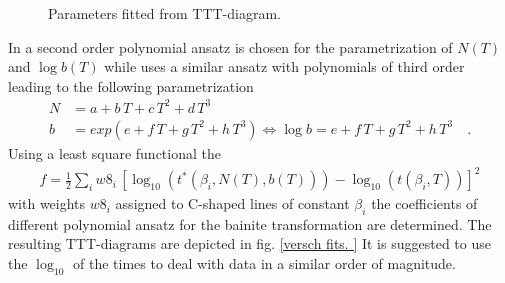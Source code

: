 
\begin{figure}[h]
\centering
{} %
\caption{Parameters fitted from TTT-diagram.}
\label{fig:plotNB}
\end{figure}

In \cite{yu_berechnung_1977} a second order polynomial ansatz is chosen for the parametrization of $N(T)$ and $\log b(T)$ while \cite{tzitzelkov_mathematische_1974} uses a similar ansatz with polynomials of third order leading to the following parametrization 
\begin{align}
	N &= a + b\,T + c\,T^2 + d\,T^3\\
	b &= exp(e + f\,T + g\,T^2 + h\,T^3) \Leftrightarrow \log b = e + f\,T + g\,T^2 + h\,T^3 \quad. 
	\label{eq:ParametrizationNb}
\end{align}
Using a least square functional the 
\begin{align}
	f = \frac{1}{2} \sum_i w8_i \, \left[ \log_{10}( t^\ast(\beta_i,N(T),b(T)) ) - \log_{10}( t(\beta_{i},T) )\right]^2 %
\end{align}
with weights $w8_i$ assigned to C-shaped lines of constant $\beta_i$ the coefficients of different polynomial ansatz for the bainite transformation are determined. The resulting TTT-diagrams are depicted in fig. \ref{versch fits. } It is suggested to use the $\log_{10}$ of the times to deal with data in a similar order of magnitude.

